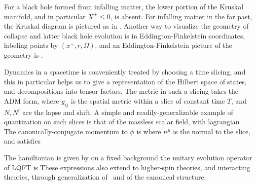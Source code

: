 

For a black hole formed from infalling matter, the lower portion of the Kruskal manifold, and  in particular $X^+\leq0$, is absent.  For infalling matter in the far past, the Kruskal diagram is pictured as in \Kdiag.  Another way to visualize the geometry of collapse and latter black hole evolution is in Eddington-Finkelstein coordinates, labeling points by $(x^+, r, \Omega)$, and an Eddington-Finkelstein picture of the geometry is \EddFink.  



Dynamics in a spacetime is conveniently treated by choosing a time slicing, and this in particular helps us to give a representation of the Hilbert space of states, and decompositions into tensor factors.   The metric in such a slicing takes the ADM form,
%
\eqn{}
%
where $g_{ij}$ is the spatial metric within a slice of constant time $T$, and $N,N^i$ are the lapse and shift.  A simple and readily-generalizable example of quantization on such slices is that of the massless scalar field, with lagrangian
%
\eqn{}
%
The canonically-conjugate momentum to $\phi$ is 
%
\eqn{}
%
where $n^\mu$ is the normal to the slice,
and satisfies
%
\eqn{}
%


The hamiltonian is given by
%
\eqn{}
%
on a fixed background the unitary evolution operator of LQFT is
%
\eqn{}
%
These expressions also extend to higher-spin theories, and interacting theories, through generalization of \hgen\ and of  the canonical structure.

